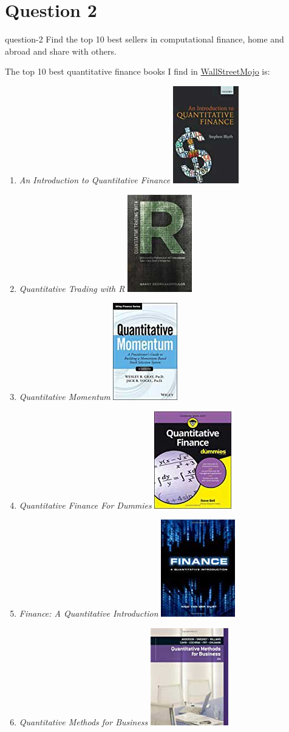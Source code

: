 \section{Question 2}
\begin{statebox}{}{question-2}
    Find the top 10 best sellers in computational finance, home and abroad and share with others.
\end{statebox}
The top 10 best quantitative finance books I find in \href{https://www.wallstreetmojo.com/top-best-quantitative-finance-books/}{WallStreetMojo} is:\cite{Dheeraj2016finace-books}
\begin{enumerate}
    \item \emph{An Introduction to Quantitative Finance}
        \hfill\includegraphics[height=.5in]{figures/2019-09-17-finance-books-1.jpg}
    \item \emph{Quantitative Trading with R}
        \hfill\includegraphics[height=.5in]{figures/2019-09-17-finance-books-2.jpg}
    \item \emph{Quantitative Momentum}
        \hfill\includegraphics[height=.5in]{figures/2019-09-17-finance-books-3.jpg}
    \item \emph{Quantitative Finance For Dummies}
        \hfill\includegraphics[height=.5in]{figures/2019-09-17-finance-books-4.jpg}
    \item \emph{Finance: A Quantitative Introduction}
        \hfill\includegraphics[height=.5in]{figures/2019-09-17-finance-books-5.jpg}
    \item \emph{Quantitative Methods for Business}
        \hfill\includegraphics[height=.5in]{figures/2019-09-17-finance-books-6.jpg}

\end{enumerate}

